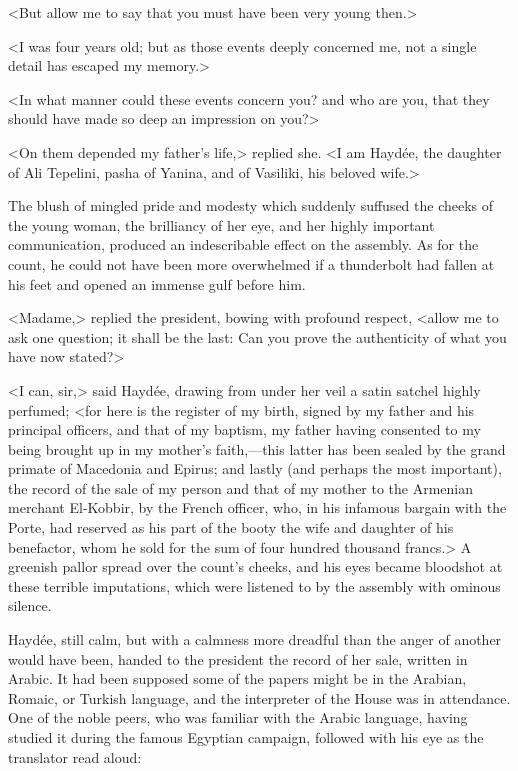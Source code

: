 <But allow me to say that you must have been very young then.>

<I was four years old; but as those events deeply concerned me, not a single detail has escaped my memory.>

<In what manner could these events concern you? and who are you, that they should have made so deep an impression on you?>

<On them depended my father's life,> replied she. <I am Haydée, the daughter of Ali Tepelini, pasha of Yanina, and of Vasiliki, his beloved wife.>

The blush of mingled pride and modesty which suddenly suffused the cheeks of the young woman, the brilliancy of her eye, and her highly important communication, produced an indescribable effect on the assembly. As for the count, he could not have been more overwhelmed if a thunderbolt had fallen at his feet and opened an immense gulf before him. 

<Madame,> replied the president, bowing with profound respect, <allow me to ask one question; it shall be the last: Can you prove the authenticity of what you have now stated?> 

<I can, sir,> said Haydée, drawing from under her veil a satin satchel highly perfumed; <for here is the register of my birth, signed by my father and his principal officers, and that of my baptism, my father having consented to my being brought up in my mother's faith,—this latter has been sealed by the grand primate of Macedonia and Epirus; and lastly (and perhaps the most important), the record of the sale of my person and that of my mother to the Armenian merchant El-Kobbir, by the French officer, who, in his infamous bargain with the Porte, had reserved as his part of the booty the wife and daughter of his benefactor, whom he sold for the sum of four hundred thousand francs.> A greenish pallor spread over the count's cheeks, and his eyes became bloodshot at these terrible imputations, which were listened to by the assembly with ominous silence. 

Haydée, still calm, but with a calmness more dreadful than the anger of another would have been, handed to the president the record of her sale, written in Arabic. It had been supposed some of the papers might be in the Arabian, Romaic, or Turkish language, and the interpreter of the House was in attendance. One of the noble peers, who was familiar with the Arabic language, having studied it during the famous Egyptian campaign, followed with his eye as the translator read aloud: 

